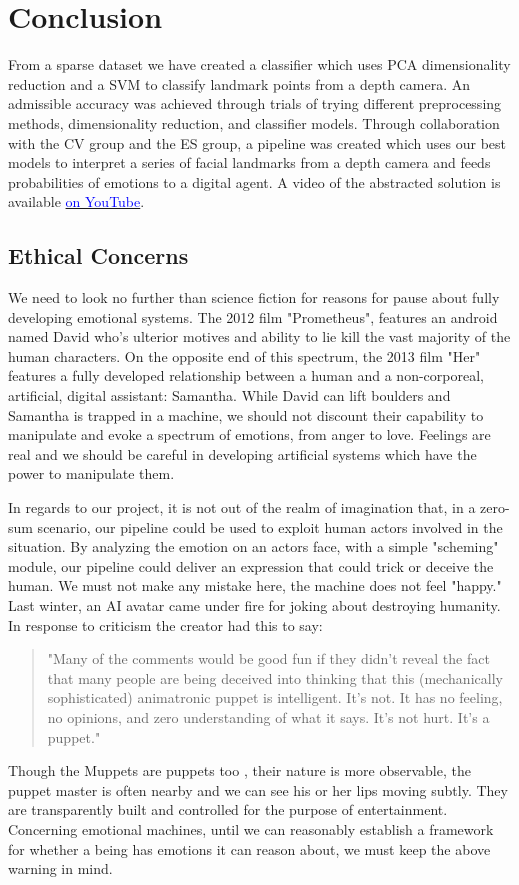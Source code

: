 \section{Conclusion}

From a sparse dataset we have created a classifier which uses PCA dimensionality reduction and a SVM to classify landmark points from a depth camera. An admissible accuracy was achieved through trials of trying different preprocessing methods, dimensionality reduction, and classifier models. Through collaboration with the CV group and the ES group, a pipeline was created which uses our best models to interpret a series of facial landmarks from a depth camera and feeds probabilities of emotions to a digital agent. A video of the abstracted solution is available \href{https://youtu.be/Owlukfpjqqk}{\textcolor{blue}{on YouTube}}.

\subsection{Ethical Concerns}
We need to look no further than science fiction for reasons for pause about fully developing emotional systems. The 2012 film "Prometheus", features an android named David who's ulterior motives and ability to lie kill the vast majority of the human characters. On the opposite end of this spectrum, the 2013 film "Her" features a fully developed relationship between a human and a non-corporeal, artificial, digital assistant: Samantha. While David can lift boulders and Samantha is trapped in a machine, we should not discount their capability to manipulate and evoke a spectrum of emotions, from anger to love. Feelings are real and we should be careful in developing artificial systems which have the power to manipulate them.

In regards to our project, it is not out of the realm of imagination that, in a zero-sum scenario, our pipeline could be used to exploit human actors involved in the situation. By analyzing the emotion on an actors face, with a simple "scheming" module, our pipeline could deliver an expression that could trick or deceive the human. We must not make any mistake here, the machine does not feel "happy." Last winter, an AI avatar came under fire for joking about destroying humanity. In response to criticism the creator had this to say:

\begin{quote}
"Many of the comments would be good fun if they didn’t reveal the fact that many people are being deceived into thinking that this (mechanically sophisticated) animatronic puppet is intelligent. It’s not. It has no feeling, no opinions, and zero understanding of what it says. It’s not hurt. It’s a puppet." \cite{sofia}
\end{quote}

Though the Muppets are puppets too \cite{muppets}, their nature is more observable, the puppet master is often nearby and we can see his or her lips moving subtly. They are transparently built and controlled for the purpose of entertainment. Concerning emotional machines, until we can reasonably establish a framework for whether a being has emotions it can reason about, we must keep the above warning in mind.